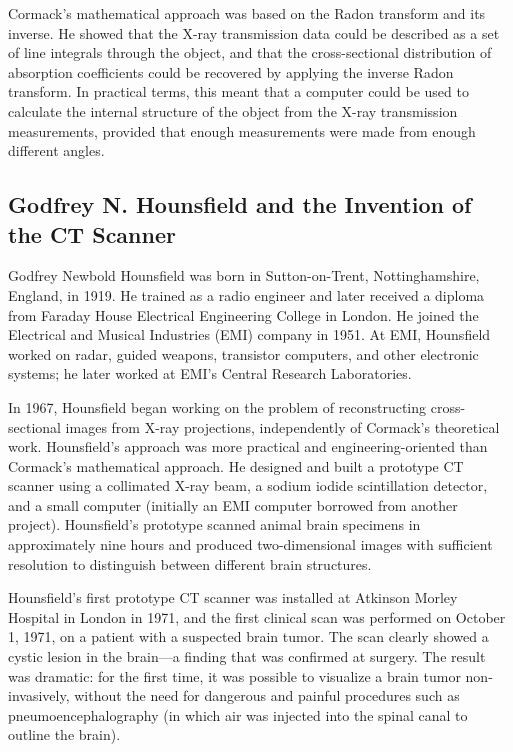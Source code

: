 Cormack's mathematical approach was based on the Radon transform and its inverse. He showed that the X-ray transmission data could be described as a set of line integrals through the object, and that the cross-sectional distribution of absorption coefficients could be recovered by applying the inverse Radon transform. In practical terms, this meant that a computer could be used to calculate the internal structure of the object from the X-ray transmission measurements, provided that enough measurements were made from enough different angles.

\subsection{Godfrey N. Hounsfield and the Invention of the CT Scanner}

Godfrey Newbold Hounsfield was born in Sutton-on-Trent, Nottinghamshire, England, in 1919. He trained as a radio engineer and later received a diploma from Faraday House Electrical Engineering College in London. He joined the Electrical and Musical Industries (EMI) company in 1951. At EMI, Hounsfield worked on radar, guided weapons, transistor computers, and other electronic systems; he later worked at EMI's Central Research Laboratories.

In 1967, Hounsfield began working on the problem of reconstructing cross-sectional images from X-ray projections, independently of Cormack's theoretical work. Hounsfield's approach was more practical and engineering-oriented than Cormack's mathematical approach. He designed and built a prototype CT scanner using a collimated X-ray beam, a sodium iodide scintillation detector, and a small computer (initially an EMI computer borrowed from another project). Hounsfield's prototype scanned animal brain specimens in approximately nine hours and produced two-dimensional images with sufficient resolution to distinguish between different brain structures.

Hounsfield's first prototype CT scanner was installed at Atkinson Morley Hospital in London in 1971, and the first clinical scan was performed on October 1, 1971, on a patient with a suspected brain tumor. The scan clearly showed a cystic lesion in the brain---a finding that was confirmed at surgery. The result was dramatic: for the first time, it was possible to visualize a brain tumor non-invasively, without the need for dangerous and painful procedures such as pneumoencephalography (in which air was injected into the spinal canal to outline the brain).

